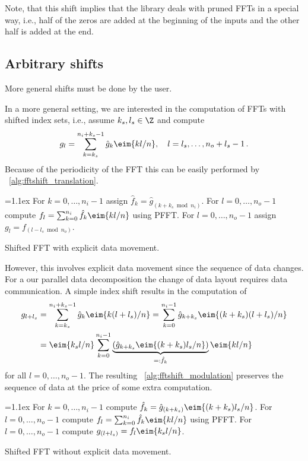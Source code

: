 Note, that this shift implies that the library deals with pruned FFTs in a special way, i.e., half of the zeros are added
at the beginning of the inputs and the other half is added at the end.






\subsection{Arbitrary shifts}
More general shifts must be done by the user.


In a more general setting, we are interested in the computation of FFTs with shifted index sets, i.e., assume $k_s,l_s\in\Z$ and compute
\begin{equation*}
  g_l = \sum_{k=k_s}^{n_i+k_s-1} \hat g_k \eim{kl/n},
  \quad l=l_s,\hdots,n_o+l_s-1\,.
\end{equation*}
Because of the periodicity of the FFT this can be easily performed by \algname~\ref{alg:fftshift_translation}.
\begin{algorithm}\label{alg:fftshift_translation}
  \begin{algorithmic}[1]
    \itemsep=1.1ex
    \State For $k=0,\hdots,n_i-1$ assign $\hat f_k = \hat g_{(k+k_s\bmod n_i)}$.
    \State For $l=0,\hdots,n_o-1$ compute $f_l = \sum_{k=0}^{n_i} \hat f_k \eim{kl/n}$ using PFFT.
    \State For $l=0,\hdots,n_o-1$ assign $g_l = f_{(l-l_s\bmod n_o)}$.
  \end{algorithmic}
  \caption{Shifted FFT with explicit data movement.}
\end{algorithm}
However, this involves explicit data movement since the sequence of data changes.
For a our parallel data decomposition the change of data layout requires data communication.
A simple index shift results in the computation of
\begin{align*}
  g_{l+l_s}
  &=
    \sum_{k=k_s}^{n_i+k_s-1} \hat g_k \eim{k(l+l_s)/n}
    =
    \sum_{k=0}^{n_i-1} \hat g_{k+k_s} \eim{(k+k_s)(l+l_s)/n} \\
  &=
    \eim{k_sl/n} \sum_{k=0}^{n_i-1} \underbrace{\left(\hat g_{k+k_s}\eim{(k+k_s)l_s/n}\right)}_{=: \hat f_k} \eim{kl/n}
\end{align*}
for all $l=0,\hdots,n_o-1$. The resulting \algname~\ref{alg:fftshift_modulation} preserves the sequence of
data at the price of some extra computation.
\begin{algorithm}\label{alg:fftshift_modulation}
  \begin{algorithmic}[1]
    \itemsep=1.1ex
    \State For $k=0,\hdots,n_i-1$ compute $\hat f_k = \hat g_{(k+k_s)} \eim{(k+k_s)l_s/n}$.
    \State For $l=0,\hdots,n_o-1$ compute $f_l = \sum_{k=0}^{n_i} \hat f_k \eim{kl/n}$ using PFFT.
    \State For $l=0,\hdots,n_o-1$ compute $g_{(l+l_s)} = f_l \eim{k_sl/n}$.
  \end{algorithmic}
  \caption{Shifted FFT without explicit data movement.}
\end{algorithm}

